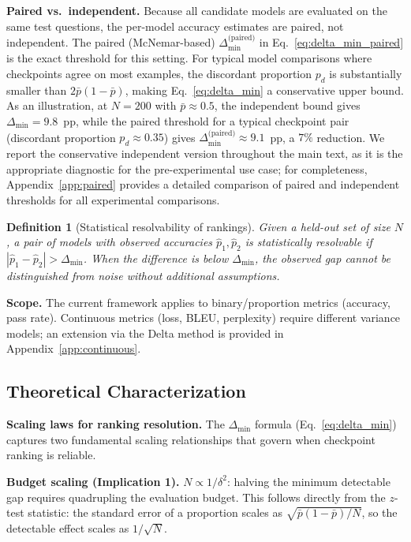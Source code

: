 \documentclass[pdflatex,sn-mathphys-ay,oneside]{sn-jnl}
\theoremstyle{thmstylethree}
\newtheorem{definition}{Definition}
\begin{document}
\noindent\textbf{Paired vs.\ independent.} Because all candidate models are evaluated on the same test questions, the per-model accuracy estimates are paired, not independent. The paired (McNemar-based) $\Delta_{\min}^{\text{(paired)}}$ in Eq.~\eqref{eq:delta_min_paired} is the exact threshold for this setting. For typical model comparisons where checkpoints agree on most examples, the discordant proportion $p_d$ is substantially smaller than $2\bar{p}(1-\bar{p})$, making Eq.~\eqref{eq:delta_min} a conservative upper bound. As an illustration, at $N=200$ with $\bar{p}\approx0.5$, the independent bound gives $\Delta_{\min}=9.8$~pp, while the paired threshold for a typical checkpoint pair (discordant proportion $p_d\approx0.35$) gives $\Delta_{\min}^{\text{(paired)}}\approx9.1$~pp, a $7\%$ reduction. We report the conservative independent version throughout the main text, as it is the appropriate diagnostic for the pre-experimental use case; for completeness, Appendix~\ref{app:paired} provides a detailed comparison of paired and independent thresholds for all experimental comparisons.

\begin{definition}[Statistical resolvability of rankings]\label{def:resolvability}
Given a held-out set of size $N$, a pair of models with observed accuracies $\hat p_1,\hat p_2$ is statistically resolvable if $|\hat p_1-\hat p_2| > \Delta_{\min}$. When the difference is below $\Delta_{\min}$, the observed gap cannot be distinguished from noise without additional assumptions.
\end{definition}

\noindent\textbf{Scope.} The current framework applies to binary/proportion metrics (accuracy, pass rate). Continuous metrics (loss, BLEU, perplexity) require different variance models; an extension via the Delta method is provided in Appendix~\ref{app:continuous}.

\subsection{Theoretical Characterization}

\textbf{Scaling laws for ranking resolution.} The $\Delta_{\min}$ formula (Eq.~\ref{eq:delta_min}) captures two fundamental scaling relationships that govern when checkpoint ranking is reliable.

\noindent\textbf{Budget scaling (Implication 1).} $N \propto 1/\delta^2$: halving the minimum detectable gap requires quadrupling the evaluation budget. This follows directly from the $z$-test statistic: the standard error of a proportion scales as $\sqrt{\bar{p}(1-\bar{p})/N}$, so the detectable effect scales as $1/\sqrt{N}$.
\end{document}
